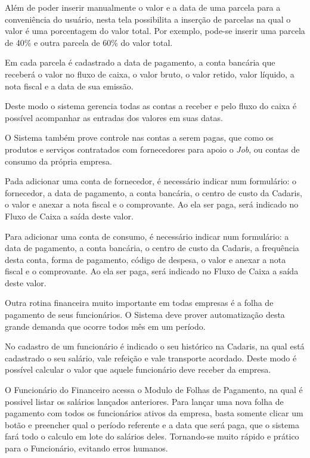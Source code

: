 \documentclass[
  12pt,            %
  openany,
  oneside,
  a4paper,         %
  english,      %
  brazil
]{article}
\numberwithin{figure}{section}
\numberwithin{table}{section}
\newcounter{subsubsubsection}[subsubsection]
\begin{document}
Além de poder inserir manualmente o valor e a data de uma parcela para a conveniência do usuário, nesta tela possibilita a inserção de parcelas na qual o valor é uma porcentagem do valor total. Por exemplo, pode-se inserir uma parcela de 40\% e outra parcela de 60\% do valor total.

Em cada parcela é cadastrado a data de pagamento, a conta bancária que receberá o valor no fluxo de caixa, o valor bruto, o valor retido, valor líquido, a nota fiscal e a data de sua emissão.

Deste modo o sistema gerencia todas as contas a receber e pelo fluxo do caixa é possível acompanhar as entradas dos valores em suas datas.



O Sistema também prove controle nas contas a serem pagas, que como os produtos e serviços contratados com fornecedores para apoio o \textit{Job}, ou contas de consumo da própria empresa.

Pada adicionar uma conta de fornecedor, é necessário indicar num formulário: o fornecedor, a data de pagamento, a conta bancária, o centro de custo da Cadaris, o valor e anexar a nota fiscal e o comprovante. Ao ela ser paga, será indicado no Fluxo de Caixa a saída deste valor.

Para adicionar uma conta de consumo, é necessário indicar num formulário: a data de pagamento, a conta bancária, o centro de custo da Cadaris, a frequência desta conta, forma de pagamento, código de despesa, o valor e anexar a nota fiscal e o comprovante. Ao ela ser paga, será indicado no Fluxo de Caixa a saída deste valor.



Outra rotina financeira muito importante em todas empresas é a folha de pagamento de seus funcionários. O Sistema deve prover automatização desta grande demanda que ocorre todos mês em um período.

No cadastro de um funcionário é indicado o seu histórico na Cadaris, na qual está cadastrado o seu salário, vale refeição e vale transporte acordado. Deste modo é possível calcular o valor que aquele funcionário deve receber da empresa.

O Funcionário do Financeiro acessa o Modulo de Folhas de Pagamento, na qual é possivel listar os salários lançados anteriores. Para lançar uma nova folha de pagamento com todos os funcionários ativos da empresa, basta somente clicar um botão e preencher qual o período referente e a data que será paga, que o sistema fará todo o calculo em lote do salários deles. Tornando-se muito rápido e prático para o Funcionário, evitando erros humanos.
\end{document}
